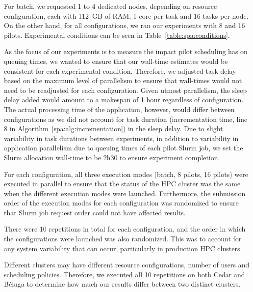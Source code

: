 	   For batch, we requested 1 to 4 dedicated nodes, depending on resource
	   configuration, each with 112~GB of RAM, 1 core per task and 16 tasks
	   per node. On the other hand, for all configurations, we ran our
	   experiments with 8 and 16 pilots. Experimental conditions can be seen
	   in Table~\ref{table:spa:conditions}.
    
	   As the focus of our experiments is to measure the impact pilot
	   scheduling has on queuing times, we wanted to ensure that our
	   wall-time estimates would be consistent for each experimental
	   condition. Therefore, we adjusted task delay based on the maximum
	   level of parallelism to ensure that wall-times would not need to be
	   readjusted for each configuration. Given utmost parallelism, the
	   sleep delay added would amount to a makespan of 1 hour regardless of
	   configuration. The actual processing time of the application,
	   however, would differ between configurations as we did not account
	   for task duration (incrementation time, line 8 in
	   Algorithm~\ref{spa:alg:incrementation}) in the sleep delay. Due to
	   slight variability in task durations between experiments, in addition
	   to variability in application parallelism due to queuing times of
	   each pilot Slurm job, we set the Slurm allocation wall-time to be
	   2h30 to ensure experiment completion.
    
	   For each configuration, all three execution modes (batch, 8 pilots,
	   16 pilots) were executed in parallel to ensure that the status of the
	   HPC cluster was the same when the different execution modes were
	   launched. Furthermore, the submission order of the execution modes
	   for each configuration was randomized to ensure that Slurm job
	   request order could not have affected results. 
    
	   There were 10 repetitions in total for each configuration, and the
	   order in which the configurations were launched was also randomized.
	   This was to account for any system variability that can occur,
	   particularly in production HPC clusters. 
    
	   Different clusters may have different resource configurations, number
	   of users and scheduling policies. Therefore, we executed all 10
	   repetitions on both Cedar and B\'eluga to determine how much our
	   results differ between two distinct clusters.
    
    
